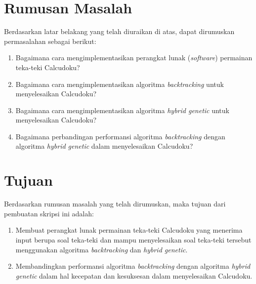 \section{Rumusan Masalah}
\label{sec:rumusan}
Berdasarkan latar belakang yang telah diuraikan di atas, dapat dirumuskan permasalahan sebagai berikut:
\begin{enumerate}
\item Bagaimana cara mengimplementasikan perangkat lunak (\textit{software}) permainan teka-teki Calcudoku?
\item Bagaimana cara mengimplementasikan algoritma \textit{backtracking} untuk menyelesaikan Calcudoku?
\item Bagaimana cara mengimplementasikan algoritma \textit{hybrid genetic} untuk menyelesaikan Calcudoku?
\item Bagaimana perbandingan performansi algoritma \textit{backtracking} dengan algoritma \textit{hybrid genetic} dalam menyelesaikan Calcudoku?
\end{enumerate}

\section{Tujuan}
\label{sec:tujuan}
Berdasarkan rumusan masalah yang telah dirumuskan, maka tujuan dari pembuatan skripsi ini adalah:
\begin{enumerate}
\item Membuat perangkat lunak permainan teka-teki Calcudoku yang menerima input berupa soal teka-teki dan mampu menyelesaikan soal teka-teki tersebut menggunakan algoritma \textit{backtracking} dan \textit{hybrid genetic}.
\item Membandingkan performansi algoritma \textit{backtracking} dengan algoritma \textit{hybrid genetic} dalam hal kecepatan dan kesuksesan dalam menyelesaikan Calcudoku.
\end{enumerate}

